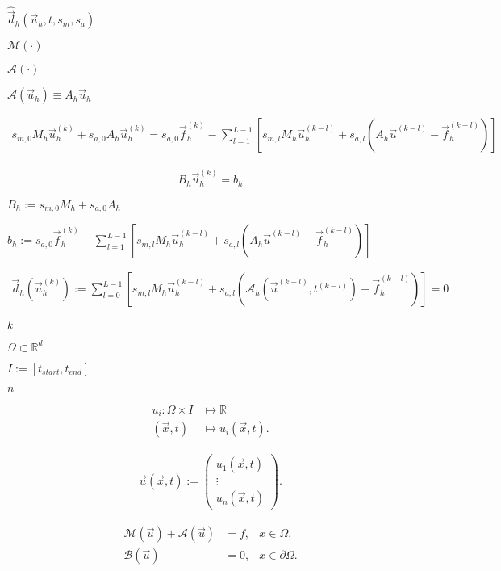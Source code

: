 \documentclass{article}
\begin{document}
$\hat{\vec{d}}_h(\vec{u}_h, t, s_m, s_a)$
\pagebreak

$\mathcal{M}(\cdot)$
\pagebreak

$\mathcal{A}(\cdot)$
\pagebreak

$\mathcal{A}(\vec{u}_h) \equiv A_h \vec{u}_h$
\pagebreak

\begin{align*} s_{m,0} M_h \vec{u}_h^{(k)} + s_{a,0} A_h \vec{u}_h^{(k)} = s_{a,0} \vec{f}_h^{(k)} - \sum_{l=1}^{L-1} \left[ s_{m,l} M_h \vec{u}_h^{(k-l)} + s_{a,l} \left( A_h \vec{u}^{(k-l)} - \vec{f}_h^{(k-l)} \right) \right] \end{align*}
\pagebreak

\begin{align*} B_h \vec{u}_h^{(k)} = b_h \end{align*}
\pagebreak

$B_h:=s_{m,0} M_h+ s_{a,0} A_h $
\pagebreak

$b_h:= s_{a,0} \vec{f}_h^{(k)} - \sum_{l=1}^{L-1} \left[ s_{m,l} M_h \vec{u}_h^{(k-l)} + s_{a,l} \left( A_h \vec{u}^{(k-l)} - \vec{f}_h^{(k-l)} \right) \right]$
\pagebreak

\begin{align*} \vec{d}_h(\vec{u}_h^{(k)}) := \sum_{l=0}^{L-1} \left[ s_{m,l} M_h \vec{u}_h^{(k-l)} + s_{a,l} \left( \mathcal{A}_h(\vec{u}^{(k-l)}, t^{(k-l)}) - \vec{f}_h^{(k-l)} \right) \right] = 0 \end{align*}
\pagebreak

$k$
\pagebreak

$ \Omega \subset \mathbb{R}^d $
\pagebreak

$ I := [t_{start}, t_{end}] $
\pagebreak

$ n $
\pagebreak

\begin{align*} u_i : \Omega \times I &\mapsto \mathbb{R}\\ (\vec{x}, t) &\mapsto u_i(\vec{x}, t). \end{align*}
\pagebreak

\begin{align*} \vec{u}(\vec{x},t) := \begin{pmatrix} u_1(\vec{x}, t) \\ \vdots \\ u_n(\vec{x}, t) \end{pmatrix}. \end{align*}
\pagebreak

\begin{align*} \mathcal{M}(\vec{u}) + \mathcal{A}(\vec{u}) &= f, &x\in\Omega,\\ \mathcal{B}(\vec{u}) &= 0, &x\in\partial \Omega. \end{align*}
\pagebreak
\end{document}
